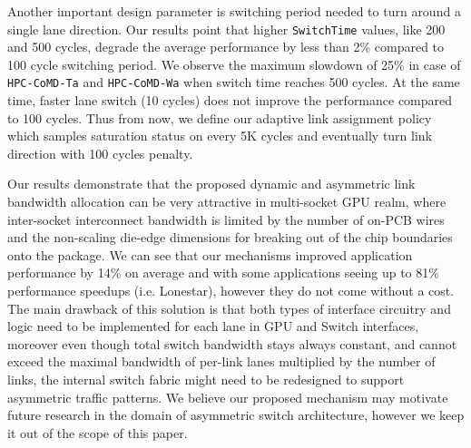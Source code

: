 Another important design parameter is switching period needed to turn around a
single lane direction. Our results point that higher \texttt{SwitchTime}
values, like 200 and 500 cycles, degrade the average performance by less than
2\% compared to 100 cycle switching period. We observe the maximum slowdown of
25\% in case of \texttt{HPC-CoMD-Ta} and \texttt{HPC-CoMD-Wa} when switch time
reaches 500 cycles. At the same time, faster lane switch (10 cycles) does not
improve the performance compared to 100 cycles. Thus from now, we define our
adaptive link assignment policy which samples saturation status on every 5K
cycles and eventually turn link direction with 100 cycles penalty.

Our results demonstrate that the proposed dynamic and asymmetric link
bandwidth allocation can be very attractive in multi-socket GPU realm, where
inter-socket interconnect bandwidth is limited by the number of on-PCB wires
and the non-scaling die-edge dimensions for breaking out of the chip boundaries
onto the package. We can see that our mechanisms improved application
performance by 14\% on average and with some applications seeing up to 81\%
performance speedups (i.e. Lonestar), however they do not come without a cost.
The main drawback of this solution is that both types of interface circuitry
and logic need to be implemented for each lane in GPU and Switch interfaces, moreover
even though total switch bandwidth stays always constant, and cannot exceed the 
maximal bandwidth of per-link lanes multiplied by the number of links, 
the internal switch fabric might need to be redesigned to support
asymmetric traffic patterns. We believe our proposed mechanism may motivate
future research in the domain of asymmetric switch architecture, however we
keep it out of the scope of this paper.

 




